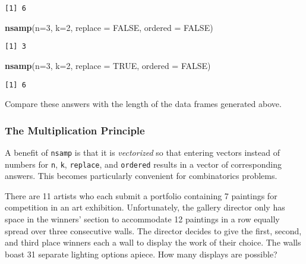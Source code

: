 \documentclass[]{book}
\newenvironment{Shaded}{\begin{snugshade}}{\end{snugshade}}
\newcommand{\KeywordTok}[1]{\textcolor[rgb]{0.13,0.29,0.53}{\textbf{{#1}}}}
\newcommand{\DataTypeTok}[1]{\textcolor[rgb]{0.13,0.29,0.53}{{#1}}}
\newcommand{\DecValTok}[1]{\textcolor[rgb]{0.00,0.00,0.81}{{#1}}}
\newcommand{\OtherTok}[1]{\textcolor[rgb]{0.56,0.35,0.01}{{#1}}}
\newcommand{\NormalTok}[1]{{#1}}
\numberwithin{equation}{chapter}
\numberwithin{figure}{chapter}
\theoremstyle{plain}
\theoremstyle{definition}
\theoremstyle{remark}
\theoremstyle{definition}
\theoremstyle{definition}
\theoremstyle{remark}
\let\BeginKnitrBlock\begin \let\EndKnitrBlock\end
\begin{document}
\begin{verbatim}
[1] 6
\end{verbatim}

\begin{Shaded}
\begin{Highlighting}[]
\KeywordTok{nsamp}\NormalTok{(}\DataTypeTok{n=}\DecValTok{3}\NormalTok{, }\DataTypeTok{k=}\DecValTok{2}\NormalTok{, }\DataTypeTok{replace =} \OtherTok{FALSE}\NormalTok{, }\DataTypeTok{ordered =} \OtherTok{FALSE}\NormalTok{) }
\end{Highlighting}
\end{Shaded}

\begin{verbatim}
[1] 3
\end{verbatim}

\begin{Shaded}
\begin{Highlighting}[]
\KeywordTok{nsamp}\NormalTok{(}\DataTypeTok{n=}\DecValTok{3}\NormalTok{, }\DataTypeTok{k=}\DecValTok{2}\NormalTok{, }\DataTypeTok{replace =} \OtherTok{TRUE}\NormalTok{, }\DataTypeTok{ordered =} \OtherTok{FALSE}\NormalTok{) }
\end{Highlighting}
\end{Shaded}

\begin{verbatim}
[1] 6
\end{verbatim}

Compare these answers with the length of the data frames generated
above.

\subsubsection{The Multiplication
Principle}\label{the-multiplication-principle}

A benefit of \texttt{nsamp} is that it is \emph{vectorized} so that
entering vectors instead of numbers for \texttt{n}, \texttt{k},
\texttt{replace}, and \texttt{ordered} results in a vector of
corresponding answers. This becomes particularly convenient for
combinatorics problems.

\bigskip

\BeginKnitrBlock{example}
\protect\hypertarget{ex:unnamed-chunk-142}{}{\label{ex:unnamed-chunk-142}}There
are 11 artists who each submit a portfolio containing 7 paintings for
competition in an art exhibition. Unfortunately, the gallery director
only has space in the winners' section to accommodate 12 paintings in a
row equally spread over three consecutive walls. The director decides to
give the first, second, and third place winners each a wall to display
the work of their choice. The walls boast 31 separate lighting options
apiece. How many displays are possible?
\EndKnitrBlock{example}
\end{document}
